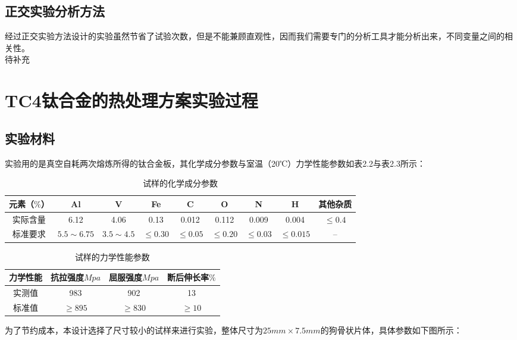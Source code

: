 \subsection{正交实验分析方法}
经过正交实验方法设计的实验虽然节省了试验次数，但是不能兼顾直观性，因而我们需要专门的分析工具才能分析出来，不同变量之间的相关性。
\\

{\Huge \color{red} 待补充}

\section{TC4钛合金的热处理方案实验过程}
\subsection{实验材料}
实验用的是真空自耗两次熔炼所得的钛合金板，其化学成分参数与室温（20℃）力学性能参数如表2.2与表2.3所示：
\begin{table}[htbp]
	\centering
	\label{sec:mytc4chem}
	\caption{试样的化学成分参数}
	\begin{tabular}{ccccccccc}
		\toprule
	元素（$ \% $） & Al & V &Fe &C& O& N &H &其他杂质\\ \midrule
	实际含量 & 6.12&4.06 &0.13 &0.012&0.112&0.009&0.004 &$ \le 0.4 $ \\
	标准要求 &$ 5.5\sim 6.75 $ & $ 3.5\sim 4.5 $&$ \le 0.30 $ & $ \le 0.05 $&$ \le 0.20 $&$ \le 0.03$ &$ \le 0.015 $  & -- \\ \bottomrule
	\end{tabular}
\end{table}

\begin{table}[htbp]
	\centering
	\label{sec:mytc4machin}
	\caption{试样的力学性能参数}
	\begin{tabular}{cccc}
		\toprule
		力学性能& 抗拉强度$Mpa  $& 屈服强度$ Mpa $&断后伸长率$ \% $\\ \midrule
		实测值 & 983 &902 & 13\\
		标准值 &$ \ge 895 $&$ \ge 830 $&$ \ge 10 $ \\ \bottomrule
	\end{tabular}
\end{table}


为了节约成本，本设计选择了尺寸较小的试样来进行实验，整体尺寸为$ 25mm\times 7.5mm $的狗骨状片体，具体参数如下图所示：

